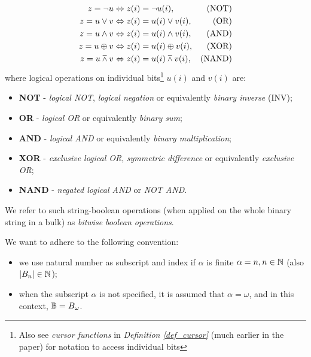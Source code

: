\begin{definition}
  \begin{align*}
    z = \neg u &\Leftrightarrow z(i) = \neg u(i), & \text{(NOT)} \\
    z = u \lor v &\Leftrightarrow z(i) = u(i) \lor v(i), & \text{(OR)} \\
    z = u \land v &\Leftrightarrow z(i) = u(i) \land v(i), & \text{(AND)} \\
    z = u \oplus v &\Leftrightarrow z(i) = u(i) \oplus v(i), & \text{(XOR)} \\
    z = u \barwedge v &\Leftrightarrow z(i) = u(i) \barwedge v(i), & \text{(NAND)} \\
  \end{align*}
  where logical operations on individual bits\footnote{Also see \textit{cursor functions} in \textit{Definition \ref{def_cursor}} (much earlier in the paper) for notation to access individual bits} $u(i)$ and $v(i)$ are:
  \begin{itemize}
    \item \textbf{NOT} - \textit{logical NOT}, \textit{logical negation} or equivalently \textit{binary inverse} (INV);
    \item \textbf{OR} - \textit{logical OR} or equivalently \textit{binary sum};
    \item \textbf{AND} - \textit{logical AND} or equivalently \textit{binary multiplication};
    \item \textbf{XOR} - \textit{exclusive logical OR}, \textit{symmetric difference} or equivalently \textit{exclusive OR};
    \item \textbf{NAND} - \textit{negated logical AND} or \textit{NOT AND}.
  \end{itemize}
  We refer to such string-boolean operations (when applied on the whole binary string in a bulk) as \textit{bitwise boolean operations}.
\end{definition}

We want to adhere to the following convention:
  \begin{itemize}
    \item we use natural number as subscript and index if $\alpha$ is finite $\alpha = n, n \in \mathbb{N}$ (also $|B_n| \in \mathbb{N}$);
    \item when the subscript \(\alpha\) is not specified, it is assumed that \(\alpha = \omega\), and in this context, $\mathbb{B} = B_\omega$.
  \end{itemize}

